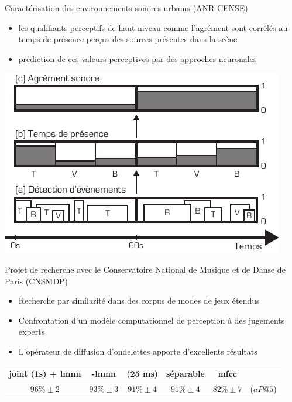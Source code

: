 \begin{frame}{Caractérisation des environnements sonores urbains (ANR CENSE)}
  \begin{minipage}{.5\columnwidth}
    \begin{itemize}
    \item les qualifiants perceptifs de haut niveau comme l'agrément sont corrélés au temps de présence perçus des sources présentes dans la scène
    \item prédiction de ces valeurs perceptives par des approches neuronales
    \end{itemize}
  \end{minipage}
  \begin{minipage}{.4\columnwidth}
    \begin{center}
    \includegraphics[width=\columnwidth]{figures/block} \\
    \end{center}
  \end{minipage}
\end{frame}

\begin{frame}{Projet de recherche avec le Conservatoire National de Musique et de Danse de Paris (CNSMDP)}
\begin{itemize}
\item Recherche par similarité dans des corpus de modes de jeux étendus
\item Confrontation d'un modèle computationnel de perception à des jugements experts
\item L'opérateur de diffusion d'ondelettes apporte d'excellents résultats
\end{itemize}
\begin{table}
\small
    \centering
{\footnotesize
\begin{tabular}{c|ccccc}
 joint (1s) + lmnn & -lmnn & (25 ms) &  séparable & mfcc & \\
      \hline
 $96\% \pm 2$ & $93\% \pm 3$ & $91\% \pm 4$ & $91\% \pm 4$ & $82\% \pm 7$ & ($aP@5$)\\
\end{tabular}
}
\end{table}
\end{frame}


